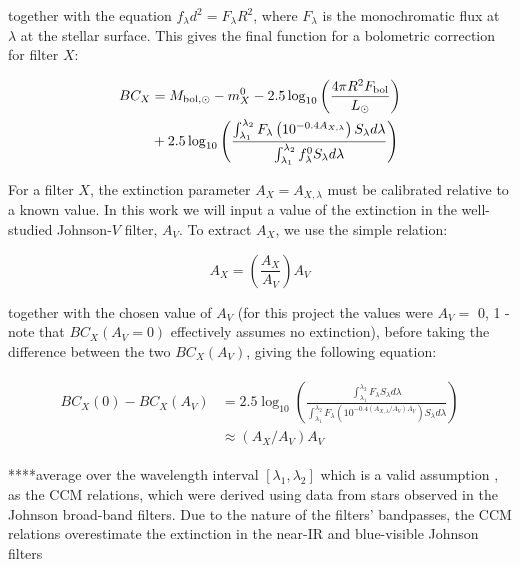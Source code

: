 \documentclass[12pt, a4paper]{report}
\begin{document}
together with the equation $f_{\lambda}d^{2}=F_{\lambda}R^{2}$, where $F_{\lambda}$ is the monochromatic flux at $\lambda$ at the stellar surface. This gives the final function for a bolometric correction for filter $X$:

\begin{align}
\begin{split}
BC_{X} &= M_{\textnormal{bol},\odot} - m_{X}^{0} - 2.5 \log_{10} \left( \frac{4\pi R^{2}F_{\textnormal{bol}}}{L_{\odot}} \right) \\
&+ 2.5 \log_{10} \left( \frac{\int_{\lambda_{1}}^{\lambda_{2}} F_{\lambda} \left( 10^{-0.4 A_{X,\lambda}} \right) S_{\lambda} d\lambda}{\int_{\lambda_{1}}^{\lambda_{2}} f_{\lambda}^{0} S_{\lambda} d\lambda} \right)
\label{BC_extinc}
\end{split}
\end{align}

For a filter $X$, the extinction parameter $A_{X} = A_{X,\lambda}$ must be calibrated relative to a known value. In this work we will input a value of the extinction in the well-studied Johnson-$V$ filter, $A_{V}$. To extract $A_{X}$, we use the simple relation:

\begin{equation}
A_{X} = \left( \frac{A_{X}}{A_{V}} \right) A_{V}
\label{ratio_eq}
\end{equation}

together with the chosen value of $A_{V}$ (for this project the values were $A_{V} =$ 0, 1 - note that $BC_{X}(A_{V}=0)$ effectively assumes no extinction), before taking the difference between the two $BC_{X}(A_{V})$, giving the following equation:

\begin{align}
\begin{split}
BC_{X}(0) - BC_{X}(A_{V}) &= 2.5 \log_{10} \left( \frac{\int_{\lambda_{1}}^{\lambda_{2}} F_{\lambda}  S_{\lambda} d\lambda}{\int_{\lambda_{1}}^{\lambda_{2}} F_{\lambda}\left( 10^{-0.4 \left(A_{X,\lambda}/A_{V}\right)A_{V}} \right) S_{\lambda} d\lambda} \right)
\\ &\approx \left(A_{X}/A_{V}\right)A_{V}
\label{BCs_diff}
\end{split}
\end{align}

****average over the wavelength interval $[\lambda_{1},\lambda_{2}]$ which is a valid assumption \citep{2014MNRAS.444..392C}, as the CCM relations, which were derived using data from stars observed in the Johnson broad-band filters. Due to the nature of the filters' bandpasses, the CCM relations overestimate the extinction in the near-IR and blue-visible Johnson filters
\end{document}
